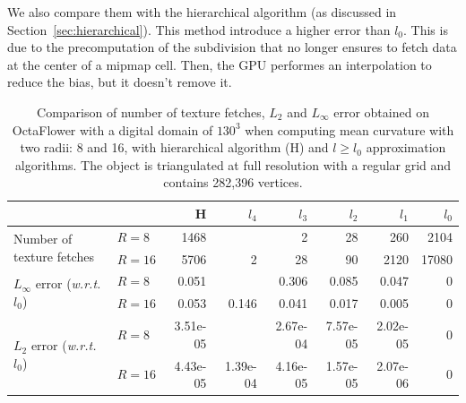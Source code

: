 \documentclass{llncs}
\newcommand{\wrt}{\emph{w.r.t.} }
\begin{document}
We also compare them with the hierarchical algorithm (as discussed in
Section~\ref{sec:hierarchical}). This method introduce a higher error than
$l_0$. This is due to the precomputation of the subdivision that no longer
ensures to fetch data at the center of a mipmap cell. Then, the GPU performes an
interpolation to reduce the bias, but it doesn't remove it.

\begin{table}
  \begin{center}
  \setlength{\tabcolsep}{0.15cm}
	\begin{tabular}{@{}llrrrrrr@{}}
      \toprule
        & & H & $l_4$ & $l_3$ & $l_2$ & $l_1$ & $l_0$\\
      \midrule
      \multirow{2}{2.2cm}{Number of texture fetches} & $R=8$ & 1468 & & 2 & 28 & 260 & 2104 \\
                                & $R=16$ & 5706 & 2 & 28 & 90 & 2120 & 17080\\\midrule

      \multirow{2}{2.2cm}{$L_\infty$ error (\wrt $l_0$)} & $R=8$ & 0.051 & & 0.306 & 0.085 & 0.047 & 0\\
                                    & $R=16$ & 0.053 & 0.146 & 0.041 & 0.017 & 0.005 & 0\\\midrule

      \multirow{2}{2.1cm}{$L_2$ error (\wrt $l_0$)} & $R=8$ & 3.51e-05 & & 2.67e-04 & 7.57e-05 & 2.02e-05 & 0\\
                               & $R=16$ & 4.43e-05 & 1.39e-04 & 4.16e-05 & 1.57e-05 & 2.07e-06 & 0\\
      \bottomrule
    \end{tabular}
  \end{center}
  \caption{Comparison of number of texture fetches, $L_2$ and $L_\infty$ error
  obtained on OctaFlower with a digital domain of $130^3$ when computing mean
  curvature with two radii: 8 and 16, with hierarchical algorithm (H) and $l \ge
  l_0$ approximation algorithms. The object is triangulated at full resolution
  with a regular grid and contains 282,396 vertices.
  \label{tab:full-res-stat}}
\end{table}
\end{document}
